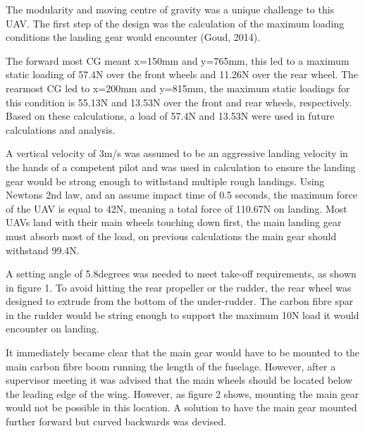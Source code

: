 \documentclass[../../main.tex]{subfiles}
\begin{document}
The modularity and moving centre of gravity was a unique challenge to this UAV.
The first step of the design was the calculation of the maximum loading conditions the landing gear would encounter (Goud, 2014). 


The forward most CG meant x=150mm and y=765mm, this led to a maximum static loading of 57.4N over the front wheels and 11.26N over the rear wheel.
The rearmost CG led to x=200mm and y=815mm, the maximum static loadings for this condition is 55.13N and 13.53N over the front and rear wheels, respectively.
Based on these calculations, a load of 57.4N and 13.53N were used in future calculations and analysis. 

A vertical velocity of 3m/s was assumed to be an aggressive landing velocity in the hands of a competent pilot and was used in calculation to ensure the landing gear would be strong enough to withstand multiple rough landings.
Using Newtons 2nd law, and an assume impact time of 0.5 seconds, the maximum force of the UAV is equal to 42N, meaning a total force of 110.67N on landing.
Most UAVs land with their main wheels touching down first, the main landing gear must absorb most of the load, on previous calculations the main gear should withstand 99.4N.  


A setting angle of 5.8degrees was needed to meet take-off requirements, as shown in figure 1.
To avoid hitting the rear propeller or the rudder, the rear wheel was designed to extrude from the bottom of the under-rudder.
The carbon fibre spar in the rudder would be string enough to support the maximum 10N load it would encounter on landing. 


It immediately became clear that the main gear would have to be mounted to the main carbon fibre boom running the length of the fuselage.
However, after a supervisor meeting it was advised that the main wheels should be located below the leading edge of the wing.
However, as figure 2 shows, mounting the main gear would not be possible in this location.
A solution to have the main gear mounted further forward but curved backwards was devised.  
\end{document}
